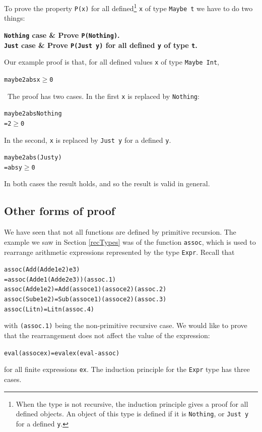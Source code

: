 To prove the property \texttt{P(x)} for all defined\footnote{When the type is
not recursive, the induction principle gives a proof for all defined objects.
An object of this type is defined if it is \texttt{Nothing}, or \texttt{Just y} for a
defined \texttt{y}.}  \texttt{x} of type \texttt{Maybe t} we have to do two things:

\medskip
\noindent
\begin{mytable}
\bf \texttt{Nothing} case & Prove \texttt{P(Nothing)}. \\
\bf \texttt{Just} case & Prove \texttt{P(Just y)} for all defined \texttt{y} of type \texttt{t}.
\end{mytable}

\medskip
\noindent
Our example proof is that, for all defined values \texttt{x} of type 
\texttt{Maybe Int},
\begin{alltt}
maybe 2 abs x \(\geq\) 0
\end{alltt}

\startpr\ The proof has two cases. In the first \texttt{x} is replaced by 
\texttt{Nothing}:
\begin{alltt}
maybe 2 abs Nothing
  = 2 \(\geq\) 0
\end{alltt}
In the second, \texttt{x} is replaced by \texttt{Just y} for a defined \texttt{y}.
\begin{alltt}
maybe 2 abs (Just y)
  = abs y \(\geq\) 0
\end{alltt}
In both cases the result holds, and so the result is valid in general.
\blackbox

\subsection*{Other forms of proof}

We have seen that not all functions are defined by primitive recursion. The
example we saw in Section \ref{recTypes} was of the function \texttt{assoc},
which is used to rearrange arithmetic expressions represented by the type \texttt{Expr}. 
Recall that
\begin{alltt}
assoc (Add (Add e1 e2) e3)
  = assoc (Add e1 (Add e2 e3)) \hfill (assoc.1)
assoc (Add e1 e2) = Add (assoc e1) (assoc e2)\hfill (assoc.2)
assoc (Sub e1 e2) = Sub (assoc e1) (assoc e2)\hfill (assoc.3)
assoc (Lit n)     = Lit n\hfill (assoc.4)
\end{alltt}
with \texttt{(assoc.1)} being the non-primitive recursive case. We would like to
prove that the rearrangement does not affect the value of the expression:
\begin{alltt}
eval (assoc ex) = eval ex \hfill (eval-assoc)
\end{alltt}
for all finite expressions \texttt{ex}. The induction principle for the \texttt{Expr}
type has three cases.

